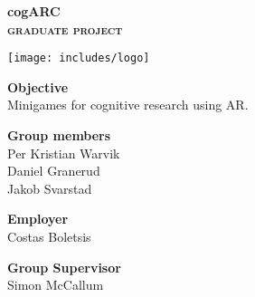 
\clearpage
\renewcommand{\headrulewidth}{0pt}
\thispagestyle{fancy}

\begin{center}
\Huge\bfseries cogARC\\
\large\bfseries\scshape graduate project
\end{center}

\vfill

\begin{center}
\texttt{[image: includes/logo]}
\end{center}

\vfill

\begin{center}
\textbf{Objective}\\
Minigames for cognitive research using AR.
\end{center}

\vfill

\begin{minipage}[t]{0.5\linewidth}
\textbf{Group members}\\
Per Kristian Warvik\\
Daniel Granerud\\
Jakob Svarstad\\
\end{minipage}
\begin{minipage}[t]{0.5\linewidth}
\end{minipage}

\vfill

\begin{minipage}[t]{0.5\linewidth}
\textbf{Employer}\\
Costas Boletsis
\end{minipage}
\begin{minipage}[t]{0.5\linewidth}
\begin{flushright}
\textbf{Group Supervisor}\\
Simon McCallum
\end{flushright}
\end{minipage}

\vfill

